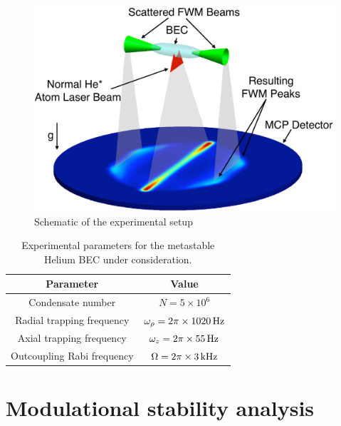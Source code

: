 \begin{figure}[htbp]
    \centering
        \includegraphics[height=3in]{Schematic}
    \caption{Schematic of the experimental setup}
    \label{Peaks:Schematic}
\end{figure}


\begin{table}
    \centering
    \begin{tabular}{cc}
    \toprule
    Parameter & Value\\
    \midrule
    Condensate number & $N = 5\times 10^6$\\
    Radial trapping frequency & $\omega_\rho = 2 \pi \times \unit[1020]{Hz}$\\
    Axial trapping frequency & $\omega_z = 2\pi \times \unit[55]{Hz}$\\
    Outcoupling Rabi frequency & $\Omega = 2\pi \times \unit[3]{kHz}$\\
    \bottomrule
    \end{tabular}
    \caption{Experimental parameters for the metastable Helium BEC under consideration.}
    \label{Peaks:ExperimentalParameters}
\end{table}



\section{Modulational stability analysis}


